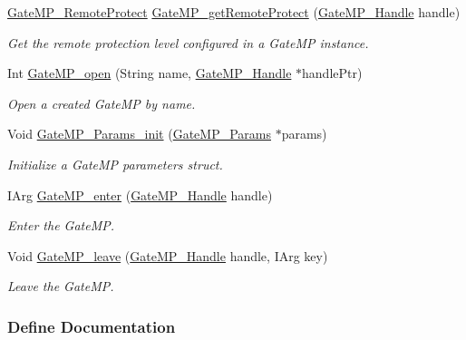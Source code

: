 \begin{DoxyCompactItemize}
\hyperlink{_gate_m_p_8h_a88716d5706d8fa8c6a3b9a4f023ef1d8}{GateMP\_\-RemoteProtect} \hyperlink{_gate_m_p_8h_a6b36fa302c1dfa45c85806990c99774a}{GateMP\_\-getRemoteProtect} (\hyperlink{_gate_m_p_8h_ad5bb259f928a14e98d973334bc60ebb3}{GateMP\_\-Handle} handle)
\begin{DoxyCompactList}\small\item\em Get the remote protection level configured in a GateMP instance. \item\end{DoxyCompactList}\item 
Int \hyperlink{_gate_m_p_8h_acefd091d723ca21a0a02e1e1d5600fc8}{GateMP\_\-open} (String name, \hyperlink{_gate_m_p_8h_ad5bb259f928a14e98d973334bc60ebb3}{GateMP\_\-Handle} $\ast$handlePtr)
\begin{DoxyCompactList}\small\item\em Open a created GateMP by name. \item\end{DoxyCompactList}\item 
Void \hyperlink{_gate_m_p_8h_aa9ed943f88964311c2447777c3b330f4}{GateMP\_\-Params\_\-init} (\hyperlink{struct_gate_m_p___params}{GateMP\_\-Params} $\ast$params)
\begin{DoxyCompactList}\small\item\em Initialize a GateMP parameters struct. \item\end{DoxyCompactList}\item 
IArg \hyperlink{_gate_m_p_8h_a20a6cab18407f07cb1dbcba48de04cd3}{GateMP\_\-enter} (\hyperlink{_gate_m_p_8h_ad5bb259f928a14e98d973334bc60ebb3}{GateMP\_\-Handle} handle)
\begin{DoxyCompactList}\small\item\em Enter the GateMP. \item\end{DoxyCompactList}\item 
Void \hyperlink{_gate_m_p_8h_a622c40958deebda445715cd8e8b3ea34}{GateMP\_\-leave} (\hyperlink{_gate_m_p_8h_ad5bb259f928a14e98d973334bc60ebb3}{GateMP\_\-Handle} handle, IArg key)
\begin{DoxyCompactList}\small\item\em Leave the GateMP. \item\end{DoxyCompactList}\end{DoxyCompactItemize}


\subsubsection{Define Documentation}
